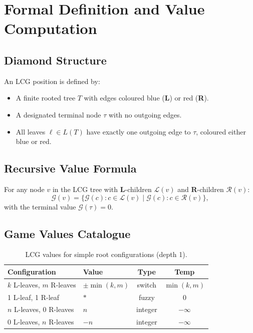 \documentclass[10pt,a4paper,twocolumn]{article}
\newcommand{\Lopt}[1]{{\color{lblue}\textbf{#1}}}
\newcommand{\Ropt}[1]{{\color{rred}\textbf{#1}}}
\newcommand{\Gv}[1]{\mathcal{G}(#1)}
\theoremstyle{plain}
\theoremstyle{definition}
\theoremstyle{remark}
\begin{document}
\section{Formal Definition and Value Computation}

\subsection{Diamond Structure}

An LCG position is defined by:
\begin{itemize}
\item A finite rooted tree $T$ with edges coloured blue (\Lopt{L}) or red (\Ropt{R}).
\item A designated terminal node $\tau$ with no outgoing edges.
\item All leaves $\ell \in L(T)$ have exactly one outgoing edge to $\tau$, coloured either blue or red.
\end{itemize}

\subsection{Recursive Value Formula}

For any node $v$ in the LCG tree with \Lopt{L}-children $\mathcal{L}(v)$ and \Ropt{R}-children $\mathcal{R}(v)$:
\[
\Gv{v} = \bigl\{ \Gv{c} : c \in \mathcal{L}(v) \;\big|\; \Gv{c} : c \in \mathcal{R}(v) \bigr\},
\]
with the terminal value $\Gv{\tau} = 0$.

\subsection{Game Values Catalogue}

\begin{table}[ht]
\centering
\small
\begin{tabular}{@{}p{3.5cm}lcc@{}}
\toprule
Configuration & Value & Type & Temp \\
\midrule
$k$ L-leaves, $m$ R-leaves & $\pm\min(k,m)$ & switch & $\min(k,m)$ \\
1 L-leaf, 1 R-leaf & $*$ & fuzzy & $0$ \\
$n$ L-leaves, 0 R-leaves & $n$ & integer & $-\infty$ \\
0 L-leaves, $n$ R-leaves & $-n$ & integer & $-\infty$ \\
\bottomrule
\end{tabular}
\caption{LCG values for simple root configurations (depth 1).}
\end{table}
\end{document}
